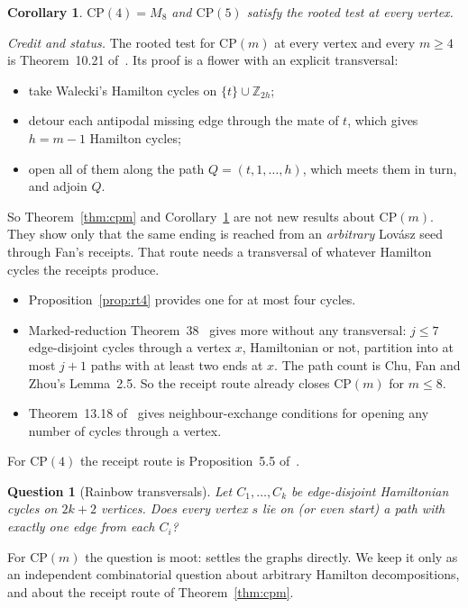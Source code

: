 \documentclass[11pt]{amsart}
\newtheorem{corollary}[theorem]{Corollary}
\newtheorem{question}[theorem]{Question}
\theoremstyle{definition}
\begin{document}
\begin{corollary}\label{cor:cp45}
$\mathrm{CP}(4)=M_8$ and $\mathrm{CP}(5)$ satisfy the rooted test at every vertex.
\end{corollary}

\emph{Credit and status.} The rooted test for $\mathrm{CP}(m)$ at every vertex and every $m\ge4$
is Theorem~10.21 of~\cite{SP}. Its proof is a flower with an explicit transversal:
\begin{itemize}
\item take Walecki's Hamilton cycles on $\{t\}\cup\mathbb Z_{2h}$;
\item detour each antipodal missing edge through the mate of $t$, which gives $h=m-1$ Hamilton cycles;
\item open all of them along the path $Q=(t,1,\dots,h)$, which meets them in turn, and adjoin $Q$.
\end{itemize}
So Theorem~\ref{thm:cpm} and Corollary~\ref{cor:cp45} are not new results about $\mathrm{CP}(m)$.
They show only that the same ending is reached from an \emph{arbitrary} Lov\'asz seed through Fan's
receipts. That route needs a transversal of whatever Hamilton cycles the receipts produce.
\begin{itemize}
\item Proposition~\ref{prop:rt4} provides one for at most four cycles.
\item Marked-reduction Theorem~38~\cite{MR} gives more without any transversal: $j\le7$
edge-disjoint cycles through a vertex $x$, Hamiltonian or not, partition into at most $j+1$ paths
with at least two ends at $x$. The path count is Chu, Fan and Zhou's Lemma~2.5. So the receipt route
already closes $\mathrm{CP}(m)$ for $m\le8$.
\item Theorem~13.18 of~\cite{SP} gives neighbour-exchange conditions for opening any number of
cycles through a vertex.
\end{itemize}
For $\mathrm{CP}(4)$ the receipt route is Proposition~5.5 of~\cite{MM}.

\begin{question}[Rainbow transversals]\label{qu:rt}
Let $C_1,\dots,C_k$ be edge-disjoint Hamiltonian cycles on $2k+2$ vertices. Does every vertex $s$
lie on (or even start) a path with exactly one edge from each $C_i$?
\end{question}

For $\mathrm{CP}(m)$ the question is moot: \cite[Theorem~10.21]{SP} settles the graphs directly. We
keep it only as an independent combinatorial question about arbitrary Hamilton decompositions, and
about the receipt route of Theorem~\ref{thm:cpm}.
\end{document}
